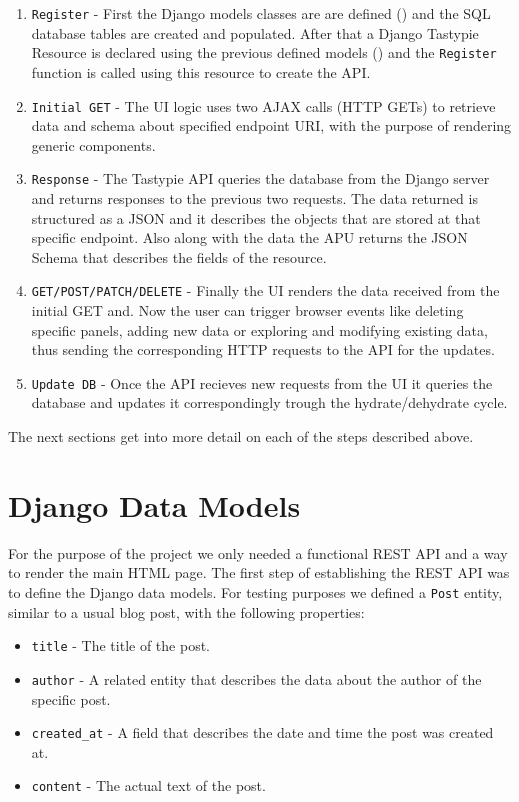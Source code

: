 \begin{enumerate}
	\item \texttt{Register} - First the Django models classes are are defined () and the SQL database tables are created and populated. After that a Django Tastypie Resource is declared using the previous defined models () and the \texttt{Register} function is called using this resource to create the API.
	\item \texttt{Initial GET} - The UI logic uses two AJAX calls (HTTP GETs) to retrieve data and schema about specified endpoint URI, with the purpose of rendering generic components.
	\item \texttt{Response} - The Tastypie API queries the database from the Django server and returns responses to the previous two requests. The data returned is structured as a JSON and it describes the objects that are stored at that specific endpoint. Also along with the data the APU returns the JSON Schema that describes the fields of the resource.
	\item \texttt{GET/POST/PATCH/DELETE} - Finally the UI renders the data received from the initial GET and. Now the user can trigger browser events like deleting specific panels, adding new data or exploring and modifying existing data, thus sending the corresponding HTTP requests to the API for the updates.
	\item \texttt{Update DB} - Once the API recieves new requests from the UI it queries the database and updates it correspondingly trough the hydrate/dehydrate cycle.
	
\end{enumerate}

The next sections get into more detail on each of the steps described above.

\section{Django Data Models}
\label{sec:django-models}

For the purpose of the project we only needed a functional REST API and a way to render the main HTML page. The first step of establishing the REST API was to define the Django data models. For testing purposes we defined a \texttt{Post} entity, similar to a usual blog post, with the following properties:

\begin{itemize}
	\item \texttt{title} - The title of the post.
	\item \texttt{author} - A related entity that describes the data about the author of the specific post.
	\item \texttt{created\_at} - A field that describes the date and time the post was created at.
	\item \texttt{content} - The actual text of the post.
\end{itemize}

